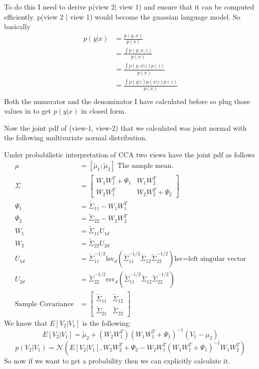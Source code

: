 \documentclass[11pt]{article}
\begin{document}
To do this I need to derive p(view 2| view 1) and ensure that it can
be computed efficiently. p(view 2 | view 1) would become the guassian
language model. 
So basically
\begin{align}
  p(y|x) &= \frac{p(y,x)}{p(x)} \\
  &= \frac{\int p(y,x,z)}{p(x)}\\
  &= \frac{\int p(y,x|z)p(z)}{p(x)}\\
  &= \frac{\int p(y|z)p(x|z)p(z)}{p(x)}\\
\end{align}
Both the numerator and the denominator I have calculated before so
plug those values in to get $p(y|x)$ in closed form.

Now the joint pdf of (view-1, view-2) that we calculated was joint normal with
the following multivariate normal distribution.

\pagebreak
Under probabilistic interpretation of CCA two views have the joint pdf as follows
\begin{align}
  \mu &= [\tilde{\mu}_1; \tilde{\mu}_2]\; \text{The sample mean.}\\
  \Sigma &= \begin{bmatrix} W_1 W_1^T + \Psi_1 & W_1 W_2^T \\ W_2 W_1^T & W_2 W_2^T + \Psi_2\end{bmatrix}\\
  \Psi_1 &= \tilde{\Sigma}_{11} - W_1 W_1^T\\
  \Psi_2 &= \tilde{\Sigma}_{22} - W_2 W_2^T\\
  W_1 &= \tilde{\Sigma}_{11}U_{1d}\\
  W_2 &= \tilde{\Sigma}_{22}U_{2d}\\
  U_{1d} &= \tilde{\Sigma}_{11}^{-1/2} \text{lsv}_d(\tilde{\Sigma}_{11}^{-1/2}\tilde{\Sigma}_{12}\tilde{\Sigma}_{22}^{-1/2})\text{lsv=left singular vector}\\
  U_{2d} &= \tilde{\Sigma}_{22}^{-1/2} \text{rsv}_d(\tilde{\Sigma}_{11}^{-1/2}\tilde{\Sigma}_{12}\tilde{\Sigma}_{22}^{-1/2})\\
  \text{Sample Covariance} &= \begin{bmatrix} \tilde{\Sigma}_{11} &
    \tilde{\Sigma}_{12} \\ \tilde{\Sigma}_{21} & \tilde{\Sigma}_{22} \end{bmatrix}
\end{align}
We know that $E[V_2 | V_1]$ is the following:
$$E[V_2 | V_1] = \tilde{\mu}_2 + (W_2W_1^T)(W_1W_1^T+\Psi_1)^{-1}(V_1 - \mu_2)$$
$$p(V_2 | V_1) = \mathcal{N}(E[V_2 | V_1], W_2W_2^T+\Psi_2 - W_2W_1^T(W_1W_1^T+\Psi_1)^{-1}W_1W_2^T)$$
So now if we want to get a probability then we can explicitly calculate it.
\end{document}
